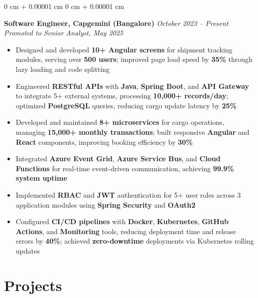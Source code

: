 \documentclass[10pt, letterpaper]{article}
\newenvironment{highlights}{
    \begin{itemize}[
        topsep=0.04 cm,
        parsep=0.04 cm,
        partopsep=0pt,
        itemsep=0pt,
        leftmargin=0 cm + 10pt
    ]
}{
    \end{itemize}
}
\newenvironment{onecolentry}{
    \begin{adjustwidth}{
        0 cm + 0.00001 cm
    }{
        0 cm + 0.00001 cm
    }
}{
    \end{adjustwidth}
}
\begin{document}
\begin{onecolentry}
   \textbf{Software Engineer, Capgemini (Bangalore)} \hfill \textit{October 2023 -- Present}
   \newline
   \textit{Promoted to Senior Analyst, May 2025}
    \begin{highlights}
        \item Designed and developed \textbf{10+ Angular screens} for shipment tracking modules, serving over \textbf{500 users}; improved page load speed by \textbf{35\%} through lazy loading and code splitting
        \item Engineered \textbf{RESTful APIs} with \textbf{Java}, \textbf{Spring Boot}, and \textbf{API Gateway} to integrate 5+ external systems, processing \textbf{10,000+ records/day}; optimized \textbf{PostgreSQL} queries, reducing cargo update latency by \textbf{25\%}
        \item Developed and maintained \textbf{8+ microservices} for cargo operations, managing \textbf{15,000+ monthly transactions}; built responsive \textbf{Angular} and \textbf{React} components, improving booking efficiency by \textbf{30\%}
        \item Integrated \textbf{Azure Event Grid}, \textbf{Azure Service Bus}, and \textbf{Cloud Functions} for real-time event-driven communication, achieving \textbf{99.9\% system uptime}
        \item Implemented \textbf{RBAC} and \textbf{JWT} authentication for 5+ user roles across 3 application modules using \textbf{Spring Security} and \textbf{OAuth2}
        \item Configured \textbf{CI/CD pipelines} with \textbf{Docker}, \textbf{Kubernetes}, \textbf{GitHub Actions}, and \textbf{Monitoring} tools, reducing deployment time and release errors by \textbf{40\%}; achieved \textbf{zero-downtime} deployments via Kubernetes rolling updates
    \end{highlights}
\end{onecolentry}

\section{Projects}

\vspace{0.02 cm}
\end{document}
